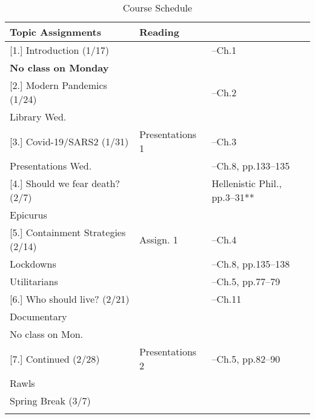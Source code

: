 \documentclass[article,oneside]{memoir}
\begin{document}
\begin{landscape}
\begin{center}
\begin{longtable}{p{6cm}p{6cm}p{4cm}}
 
  \caption{Course Schedule} \\
  \toprule
  \textbf{Topic}    \textbf{Assignments} & \textbf{Reading} \\
  \midrule

  
[1.] Introduction (1/17) 						& 				&  --Ch.1 \\ 
\textbf{No class on Monday}					&				&   \\ [1.8\baselineskip] \hline


[2.] Modern Pandemics (1/24)	  				&  				& --Ch.2\\
Library Wed.					 			&				&  \\  [1.8\baselineskip] \hline



[3.] Covid-19/SARS2 (1/31)					& Presentations 1		& --Ch.3   \\ 
Presentations Wed.							& 					& --Ch.8, pp.133--135\\ [1.8\baselineskip]  \hline 

[4.] Should we fear death? (2/7)  				&     	 				&  Hellenistic Phil., pp.3–31** \\
Epicurus					  				& 					&  \\ [1.8\baselineskip]  \hline %


[5.] Containment Strategies (2/14)				& Assign. 1 			&  --Ch.4  \\
Lockdowns			    	    	 			&					&  --Ch.8, pp.135--138  \\ 
Utilitarians		    	    			 			&					&  --Ch.5, pp.77--79 \\  [1.8\baselineskip]  \hline 

[6.] Who should live?  (2/21)	   	 			&     					&  --Ch.11 \\
Documentary								&					&	 \\
No class on Mon.			     				&					&  	 \\ [1.8\baselineskip]  \hline 

[7.] Continued (2/28)							& Presentations 2		&  --Ch.5, pp.82--90 \\
Rawls							 		&	  				& \\  [1.8\baselineskip]  \hline


Spring Break (3/7) & &  \\ 
 & &  \\ [1.8\baselineskip]  \hline
 							


\end{longtable}
\end{center}
\end{landscape}
\end{document}
